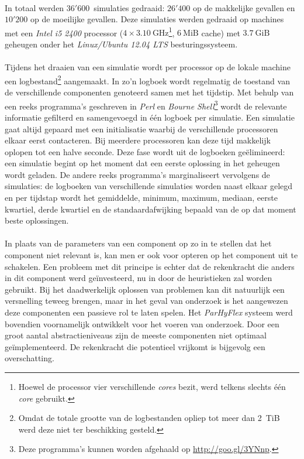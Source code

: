\paragraph{}
In totaal werden $36'600$~simulaties gedraaid: $26'400$ op de makkelijke gevallen en $10'200$ op de moeilijke gevallen. Deze simulaties werden gedraaid op machines met een \emph{Intel i5 2400} processor ($4\times3.10~\mbox{GHz}$\footnote{Hoewel de processor vier verschillende \emph{cores} bezit, werd telkens slechts \'e\'en \emph{core} gebruikt.}, $6~\mbox{MiB}$ cache) met $3.7~\mbox{GiB}$ geheugen onder het \emph{Linux/Ubuntu 12.04 LTS} besturingssysteem.

\paragraph{}
Tijdens het draaien van een simulatie wordt per processor op de lokale machine een logbestand\footnote{Omdat de totale grootte van de logbestanden opliep tot meer dan 2~\mbox{TiB} werd deze niet ter beschikking gesteld.} aangemaakt. In zo'n logboek wordt regelmatig de toestand van de verschillende componenten genoteerd samen met het tijdstip. Met behulp van een reeks programma's geschreven in \emph{Perl} en \emph{Bourne Shell}\footnote{Deze programma's kunnen worden afgehaald op \url{http://goo.gl/3YNnp}.} wordt de relevante informatie gefilterd en samengevoegd in \'e\'en logboek per simulatie. Een simulatie gaat altijd gepaard met een initialisatie waarbij de verschillende processoren elkaar eerst contacteren. Bij meerdere processoren kan deze tijd makkelijk oplopen tot een halve seconde. Deze fase wordt uit de logboeken ge\"elimineerd: een simulatie begint op het moment dat een eerste oplossing in het geheugen wordt geladen. De andere reeks programma's marginaliseert vervolgens de simulaties: de logboeken van verschillende simulaties worden naast elkaar gelegd en per tijdstap wordt het gemiddelde, minimum, maximum, mediaan, eerste kwartiel, derde kwartiel en de standaardafwijking bepaald van de op dat moment beste oplossingen.

\paragraph{}
In plaats van de parameters van een component op zo in te stellen dat het component niet relevant is, kan men er ook voor opteren op het component uit te schakelen. Een probleem met dit principe is echter dat de rekenkracht die anders in dit component werd ge\"investeerd, nu in door de heuristieken zal worden gebruikt. Bij het daadwerkelijk oplossen van problemen kan dit natuurlijk een versnelling teweeg brengen, maar in het geval van onderzoek is het aangewezen deze componenten een passieve rol te laten spelen. Het \emph{ParHyFlex} systeem werd bovendien voornamelijk ontwikkelt voor het voeren van onderzoek. Door een groot aantal abstractieniveaus zijn de meeste componenten niet optimaal ge\"implementeerd. De rekenkracht die potentieel vrijkomt is bijgevolg een overschatting.

